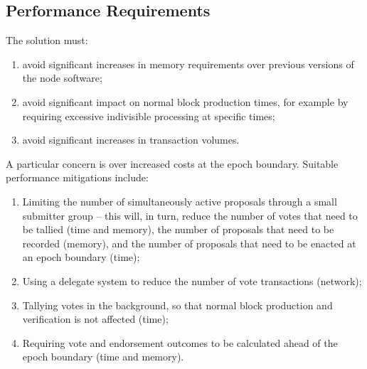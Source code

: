 \pagebreak
\subsection{Performance Requirements}
\label{sect:performance}

The solution must:

\begin{enumerate}
\item
  avoid significant increases in memory requirements over previous versions of the node software;
\item
  avoid significant impact on normal block production times, for example by requiring excessive indivisible processing at specific times;
\item
  avoid significant increases in transaction volumes.
\end{enumerate}

A particular concern is over increased costs at the epoch boundary.
%
Suitable performance mitigations include:

\begin{enumerate}
\item
  Limiting the number of simultaneously active proposals through a small submitter group
  -- this will, in turn, reduce the number of votes that need to be tallied (time and memory),  the number of proposals that need to be recorded (memory), and the number of proposals that need to be enacted at an epoch boundary (time);
\item
  Using a delegate system to reduce the number of vote transactions (network);
\item
  Tallying votes in the background, so that normal block production and verification is not affected (time);
\item
  Requiring vote and endorsement outcomes to be calculated ahead of the epoch boundary (time and memory).
\end{enumerate}
